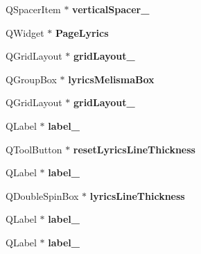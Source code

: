 \begin{DoxyCompactItemize}
Q\+Spacer\+Item $\ast$ {\bfseries vertical\+Spacer\+\_}
\item 
\mbox{\label{class_ui___edit_style_base_a64a2d74b61a104bb7bf585196d814746}} 
Q\+Widget $\ast$ {\bfseries Page\+Lyrics}
\item 
\mbox{\label{class_ui___edit_style_base_a086569fedb7b18132fcc1ccf57a0d302}} 
Q\+Grid\+Layout $\ast$ {\bfseries grid\+Layout\+\_}
\item 
\mbox{\label{class_ui___edit_style_base_ab977c942c89aa62677cf8fdd38ce48ec}} 
Q\+Group\+Box $\ast$ {\bfseries lyrics\+Melisma\+Box}
\item 
\mbox{\label{class_ui___edit_style_base_afbcf4726c54dc6fe0b988fb7d376da07}} 
Q\+Grid\+Layout $\ast$ {\bfseries grid\+Layout\+\_}
\item 
\mbox{\label{class_ui___edit_style_base_a034d9bfb4e5ab56aa12b6af99e888b85}} 
Q\+Label $\ast$ {\bfseries label\+\_}
\item 
\mbox{\label{class_ui___edit_style_base_adc93b2a9888ca713b7f5fc21bd6b1cea}} 
Q\+Tool\+Button $\ast$ {\bfseries reset\+Lyrics\+Line\+Thickness}
\item 
\mbox{\label{class_ui___edit_style_base_ab7a539cb0cb1fdccc40df41b618daf4e}} 
Q\+Label $\ast$ {\bfseries label\+\_}
\item 
\mbox{\label{class_ui___edit_style_base_a890dae758b9afd284fe179e054d6d699}} 
Q\+Double\+Spin\+Box $\ast$ {\bfseries lyrics\+Line\+Thickness}
\item 
\mbox{\label{class_ui___edit_style_base_ae879455e5b211bd5bc2ded8fa0ccbedc}} 
Q\+Label $\ast$ {\bfseries label\+\_}
\item 
\mbox{\label{class_ui___edit_style_base_adb14ab1e7ba1ab178e7771cbfb862c36}} 
Q\+Label $\ast$ {\bfseries label\+\_}
\item 
\mbox{\label{class_ui___edit_style_base_ad36a5149aaac8303f1e38c5d47de63ee}} 

\end{DoxyCompactItemize}
